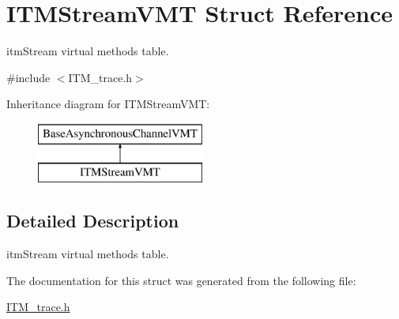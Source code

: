 \hypertarget{structITMStreamVMT}{\section{I\+T\+M\+Stream\+V\+M\+T Struct Reference}
\label{structITMStreamVMT}
}


{\ttfamily itm\+Stream} virtual methods table.  




{\ttfamily \#include $<$I\+T\+M\+\_\+trace.\+h$>$}

Inheritance diagram for I\+T\+M\+Stream\+V\+M\+T\+:\begin{figure}[H]
\begin{center}
\leavevmode
\includegraphics[height=2.000000cm]{structITMStreamVMT}
\end{center}
\end{figure}


\subsection{Detailed Description}
{\ttfamily itm\+Stream} virtual methods table. 

The documentation for this struct was generated from the following file\+:\begin{DoxyCompactItemize}
\item 
\hyperlink{ITM__trace_8h}{I\+T\+M\+\_\+trace.\+h}\end{DoxyCompactItemize}
